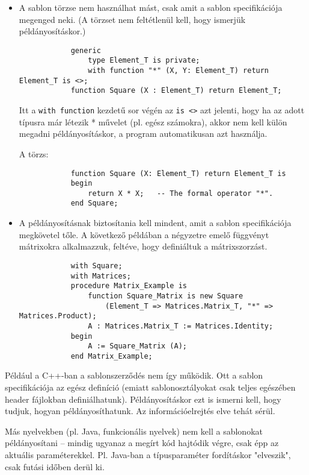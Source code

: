\documentclass[margin=0px]{article}
\begin{document}
\begin{itemize}
    \item	A sablon törzse nem használhat mást, csak amit a sablon specifikációja megenged neki. (A törzset
          nem feltétlenül kell, hogy ismerjük példányosításkor.)
          \begin{verbatim}
            generic
                type Element_T is private;
                with function "*" (X, Y: Element_T) return Element_T is <>;
            function Square (X : Element_T) return Element_T;
        \end{verbatim}
          Itt a \texttt{with function} kezdetű sor végén az \texttt{is <>} azt jelenti, hogy ha az adott típusra már létezik *
          művelet (pl. egész számokra), akkor nem kell külön megadni példányosításkor, a program automatikusan azt használja.

          A törzs:
          \begin{verbatim}
            function Square (X: Element_T) return Element_T is
            begin
                return X * X;   -- The formal operator "*".
            end Square;
        \end{verbatim}

    \item	A példányosításnak biztosítania kell mindent, amit a sablon specifikációja megkövetel tőle.
          A következő példában a négyzetre emelő függvényt mátrixokra alkalmazzuk, feltéve, hogy definiáltuk a
          mátrixszorzást.
          \begin{verbatim}
            with Square;
            with Matrices;
            procedure Matrix_Example is
                function Square_Matrix is new Square
                    (Element_T => Matrices.Matrix_T, "*" => Matrices.Product);
                A : Matrices.Matrix_T := Matrices.Identity;
            begin
                A := Square_Matrix (A);
            end Matrix_Example;
        \end{verbatim}
\end{itemize}

Például a C++-ban a sablonszerződés nem így működik. Ott a sablon specifikációja az egész
definíció (emiatt sablonosztályokat csak teljes egészében header fájlokban definiálhatunk).
Példányosításkor ezt is ismerni kell, hogy tudjuk, hogyan példányosíthatunk. Az információelrejtés
elve tehát sérül.

Más nyelvekben (pl. Java, funkcionális nyelvek) nem kell a sablonokat példányosítani – mindig ugyanaz a
megírt kód hajtódik végre, csak épp az aktuális paraméterekkel. Pl. Java-ban a típusparaméter fordításkor "elveszik",
csak futási időben derül ki.
\end{document}
